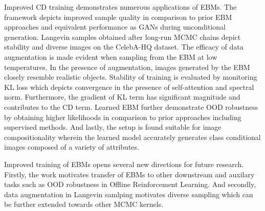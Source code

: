 \documentclass[11pt,letterpaper]{article}
\begin{document}
Improved CD training demonstrates numerous applications of EBMs. The framework depicts improved sample quality in comparison to prior EBM approaches and equivalent performance as GANs during unconditional generation. Langevin samples obtained after long-run MCMC chains depict stability and diverse images on the CelebA-HQ dataset. The efficacy of data augmentation is made evident when sampling from the EBM at low temperatures. In the presence of augmentation, images generated by the EBM closely resemble realistic objects. Stability of training is evaluated by monitoring KL loss which depicts convergence in the presence of self-attention and spectral norm. Furthermore, the gradient of KL term has significant magnitude and contributes to the CD term. Learned EBM further demonstrate OOD robustness by obtaining higher likelihoods in comparison to prior approaches including supervised methods. And lastly, the setup is found suitable for image compositionality wherein the learned model accurately generates class conditional images composed of a variety of attributes. 

Improved training of EBMs opens several new directions for future research. Firstly, the work motivates transfer of EBMs to other downstream and auxilary tasks such as OOD robustness in Offline Reinforcement Learning. And secondly, data augmentation in Langevin samlping motivates diverse sampling which can be further extended towards other MCMC kernels.
\end{document}
